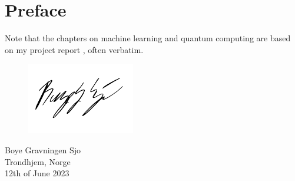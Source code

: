 \chapter{Preface}
\lipsum[1]

Note that the chapters on machine learning and quantum computing are based on my project report \autocite{sjo2021}, often verbatim.

\vspace{1.5cm}
\begin{figure}[h]
    \raggedleft
    \includegraphics[width=0.3\linewidth]{blank.pdf}
\end{figure}
\begin{flushright}
    \vspace{-1.3cm}
    Boye Gravningen Sjo \\
    Trondhjem, Norge \\
    12th of June 2023
\end{flushright}

\cleardoublepage